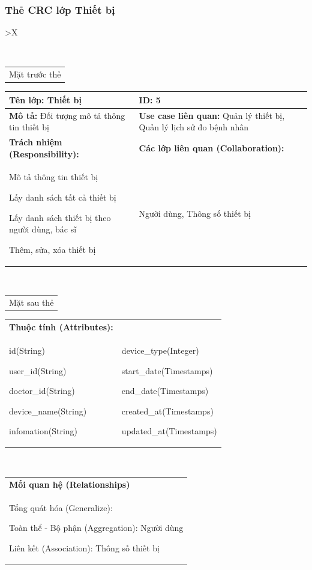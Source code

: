   \subsubsection{Thẻ CRC lớp Thiết bị}
  \begin{xltabular}{\textwidth}{
    >{\centering\arraybackslash}X 
  }
  \caption{\bfseries \fontsize{12pt}{0pt}\selectfont Thẻ CRC lớp Thiết bị}
  \\
  \begin{tabularx}{0.9\textwidth}{X}
    Mặt trước thẻ
  \end{tabularx}
  \begin{tabularx}{0.9\textwidth}{|X|X|}
    \hline
    \textbf{Tên lớp:} Thiết bị & \textbf{ID:} 5 \\
    \hline
    \textbf{Mô tả:} Đối tượng mô tả thông tin thiết bị & \textbf{Use case liên quan:} Quản lý thiết bị, Quản lý lịch sử đo bệnh nhân \\
    \hline
    \textbf{Trách nhiệm (Responsibility):} & \textbf{Các lớp liên quan (Collaboration):} \\
    Mô tả thông tin thiết bị

    Lấy danh sách tất cả thiết bị

    Lấy danh sách thiết bị theo người dùng, bác sĩ
    
    Thêm, sửa, xóa thiết bị
    & 
    Người dùng, Thông số thiết bị 
    \\
    \hline
  \end{tabularx}
  \\ 
  \begin{tabularx}{0.9\textwidth}{X}
    Mặt sau thẻ
  \end{tabularx} 
  \begin{tabularx}{0.9\textwidth}{|X|X|}
    \hline
    \textbf{Thuộc tính (Attributes):} & \\
    id(String) 
    
    user\_id(String)

    doctor\_id(String)

    device\_name(String)

    infomation(String)
    & 
    device\_type(Integer)

    start\_date(Timestamps) 
    
    end\_date(Timestamps) 
    
    created\_at(Timestamps)

    updated\_at(Timestamps)
    \\
    \hline
  \end{tabularx}
  \\     
  \begin{tabularx}{0.9\textwidth}{|X|}
    \textbf{Mối quan hệ (Relationships)} \\
    Tổng quát hóa (Generalize):  

    Toàn thể - Bộ phận (Aggregation): Người dùng
      
    Liên kết (Association): Thông số thiết bị
    \\
    \hline
  \end{tabularx}
  \end{xltabular}
  \newpage

